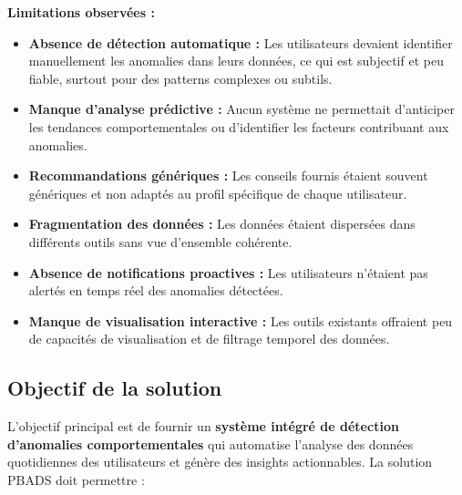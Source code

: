 \textbf{Limitations observées :}

\begin{itemize}
    \item \textbf{Absence de détection automatique :} Les utilisateurs devaient identifier manuellement les anomalies dans leurs données, ce qui est subjectif et peu fiable, surtout pour des patterns complexes ou subtils.
    \item \textbf{Manque d'analyse prédictive :} Aucun système ne permettait d'anticiper les tendances comportementales ou d'identifier les facteurs contribuant aux anomalies.
    \item \textbf{Recommandations génériques :} Les conseils fournis étaient souvent génériques et non adaptés au profil spécifique de chaque utilisateur.
    \item \textbf{Fragmentation des données :} Les données étaient dispersées dans différents outils sans vue d'ensemble cohérente.
    \item \textbf{Absence de notifications proactives :} Les utilisateurs n'étaient pas alertés en temps réel des anomalies détectées.
    \item \textbf{Manque de visualisation interactive :} Les outils existants offraient peu de capacités de visualisation et de filtrage temporel des données.
\end{itemize}

\subsection{Objectif de la solution}
L'objectif principal est de fournir un \textbf{système intégré de détection d'anomalies comportementales} qui automatise l'analyse des données quotidiennes des utilisateurs et génère des insights actionnables. La solution PBADS doit permettre :


